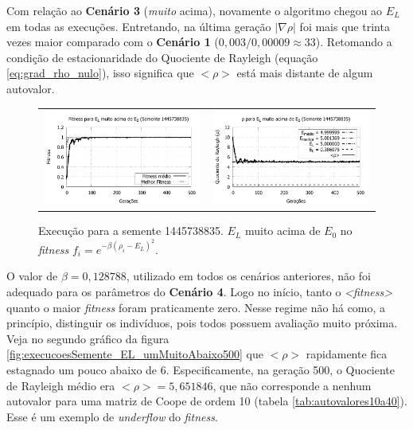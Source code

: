 	Com relação ao \textbf{Cenário 3} (\emph{muito} acima), novamente o algoritmo chegou ao $E_L$ em todas as execuções. Entretando, na última geração $|\nabla\rho|$ foi mais que trinta vezes maior comparado com o \textbf{Cenário 1} ($0,003 / 0,00009 \approx 33$). Retomando a condição de estacionaridade do Quociente de Rayleigh (equação \ref{eq:grad_rho_nulo}), isso significa que $<\rho>$ está mais distante de algum autovalor.

	\begin{figure}[htbp]
	\centering
  \begin{tabular}{@{}cc@{}}	
		\includegraphics[width=.45\textwidth]{figs/resultados/variandoELSemente/T3_S-1445738835_fitness.pdf} &
    \includegraphics[width=.45\textwidth]{figs/resultados/variandoELSemente/T3_S-1445738835_rho.pdf}
  \end{tabular}
  \caption{Execução para a semente 1445738835. $E_L$ muito acima de $E_0$ no \textit{fitness} $f_i = e^{-\beta(\rho_i - E_L)^2}$.}
	\label{fig:execucoesSemente_EL_umMuitoAcima}
	\end{figure}
		
	O valor de $\beta = 0,128788$, utilizado em todos os cenários anteriores, não foi adequado para os parâmetros do \textbf{Cenário 4}. Logo no início, tanto o \emph{<fitness>} quanto o maior \emph{fitness} foram praticamente zero.  Nesse regime não há como, a princípio, distinguir os indivíduos, pois todos possuem avaliação muito próxima. Veja no segundo gráfico da figura \ref{fig:execucoesSemente_EL_umMuitoAbaixo500} que $<\rho>$ rapidamente fica estagnado um pouco abaixo de 6. Especificamente, na geração 500, o Quociente de Rayleigh médio era $<\rho> = 5,651846$, que não corresponde a nenhum autovalor para uma matriz de Coope de ordem 10 (tabela \ref{tab:autovalores10a40}). Esse é um exemplo de \emph{underflow} do \emph{fitness}.
	
